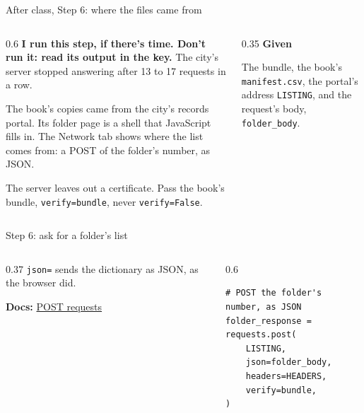 \documentclass[9pt,aspectratio=169]{beamer}
\begin{document}
\begin{frame}{After class, Step 6: where the files came from}
    \begin{columns}[T]
        \begin{column}{0.6\textwidth}
            \textbf{I run this step, if there's time. Don't run it: read its output in the key.} The city's server stopped answering after 13 to 17 requests in a row.

            \medskip
            The book's copies came from the city's records portal. Its folder page is a shell that JavaScript fills in. The Network tab shows where the list comes from: a POST of the folder's number, as JSON.

            \medskip
            The server leaves out a certificate. Pass the book's bundle, \texttt{verify=bundle}, never \texttt{verify=False}.
        \end{column}
        \begin{column}{0.35\textwidth}
            \textbf{Given}\\[2pt]
            {\footnotesize The bundle, the book's \texttt{manifest.csv}, the portal's address \texttt{LISTING}, and the request's body, \texttt{folder\_body}.\par}
        \end{column}
    \end{columns}
\end{frame}

\begin{frame}[fragile]{Step 6: ask for a folder's list}
    \begin{columns}[T]
        \begin{column}{0.37\textwidth}
            \texttt{json=} sends the dictionary as JSON, as the browser did.

            \medskip
            {\scriptsize\textbf{Docs:} \href{https://requests.readthedocs.io/en/stable/user/quickstart/\#more-complicated-post-requests}{POST requests}\par}
        \end{column}
        \begin{column}{0.6\textwidth}
\begin{lstlisting}
# POST the folder's number, as JSON
folder_response = requests.post(
    LISTING,
    json=folder_body,
    headers=HEADERS,
    verify=bundle,
)
\end{lstlisting}
        \end{column}
    \end{columns}
\end{frame}
\end{document}
